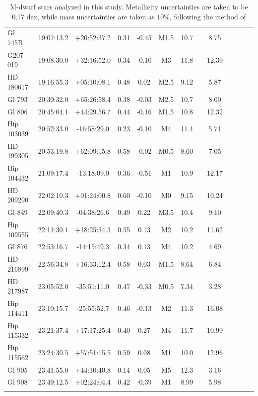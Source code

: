 \begin{landscape}
{\begin{longtable}{l|cccccccccccc}
    Gl 745B & 19:07:13.2 & +20:52:37.2 & 0.31 & -0.45 & M1.5 & 10.7 & \citet{Koen10} & 8.75  \\
 G207-019 & 19:08:30.0 & +32:16:52.0 & 0.34 & -0.10 & M3 & 11.8 & \citet{Kharchenko01} & 12.39   \\
   HD 180617 & 19:16:55.3 & +05:10:08.1 & 0.48 & 0.02 & M2.5 &  9.12 & \citet{Koen10} &  5.87  \\
     Gl 793 & 20:30:32.0 & +65:26:58.4 & 0.38 & -0.03 & M2.5 & 10.7 & \citet{Hog00} &  8.00  \\ 
     Gl 806 & 20:45:04.1 & +44:29.56.7 & 0.44 & -0.16 & M1.5 & 10.8 & \citet{Hog00} & 12.32    \\ 
 Hip 103039 & 20:52:33.0 & -16:58:29.0 & 0.23 & -0.10 & M4 & 11.4 & \citet{Koen10} & 5.71  \\
   HD 199305 & 20:53:19.8 & +62:09:15.8 &  0.58 & -0.02 & M0.5 &  8.60 & \citet{Hog00} &  7.05   \\ 
 Hip 104432 & 21:09:17.4 & -13:18:09.0 & 0.36 & -0.51 & M1 & 10.9 & \citet{Landolt09} & 12.17   \\ 
   HD 209290 & 22:02:10.3 & +01:24:00.8 & 0.60 & -0.10 & M0 & 9.15 & \citet{Koen10} & 10.24  \\ 
 Gl 849 & 22:09:40.3 & -04:38:26.6 & 0.49 & 0.22 & M3.5 & 10.4 & \citet{Koen10} &  9.10  \\
 Hip 109555 & 22:11:30.1 & +18:25:34.3 & 0.55 & 0.13 & M2 & 10.2 & \citet{Koen10} & 11.62   \\
     Gl 876 & 22:53:16.7 & -14:15:49.3 & 0.34 & 0.13 & M4 & 10.2 & \citet{Landolt09} &  4.69 \\
   HD 216899 & 22:56:34.8 & +16:33:12.4 & 0.58 & 0.03 & M1.5 & 8.64 & \citet{Koen10} & 6.84 \\
   HD 217987 & 23:05:52.0 & -35:51:11.0 & 0.47 & -0.33 & M0.5 & 7.34 & \citet{Gliese91} & 3.28  \\ 
 Hip 114411 & 23:10:15.7 & -25:55:52.7 & 0.46 & -0.13 & M2 & 11.3 & \citet{Koen10} & 16.08   \\ 
 Hip 115332 & 23:21:37.4 & +17:17:25.4 & 0.40 & 0.27 & M4 & 11.7 & \citet{Koen10} & 10.99  \\ 
 Hip 115562 & 23:24:30.5 & +57:51:15.5 & 0.59 & 0.08 &  M1 & 10.0 & \citet{Gliese91} & 12.96\\ 
 Gl 905 & 23:41:55.0 & +44:10:40.8 & 0.14 & 0.05 & M5 & 12.3 & \citet{Jenkins09} & 3.16 \\
     Gl 908 & 23:49:12.5 & +02:24:04.4 & 0.42 & -0.39 & M1 & 8.99 & \citet{Landolt09} &  5.98\\
\hline
\caption[M-dwarf stars analyzed in this study]{M-dwarf stars analyzed in this study. Metallicity uncertainties are taken to be 0.17 dex, while mass uncertainties are taken as $10\%$, following the method of \citet{Delfosse00}}
\label{T1}
\end{longtable}
}
\end{landscape}


